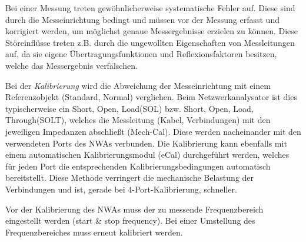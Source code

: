 Bei einer Messung treten gewöhnlicherweise systematische Fehler auf. Diese sind
durch die Messeinrichtung bedingt und müssen vor der Messung erfasst und
korrigiert werden, um möglichst genaue Messergebnisse erzielen zu können. Diese
Störeinflüsse treten z.B. durch die ungewollten Eigenschaften von Messleitungen
auf, da sie eigene Übertragungsfunktionen und Reflexionsfaktoren besitzen,
welche das Messergebnis verfälschen.

Bei der \emph{Kalibrierung} wird die Abweichung der Messeinrichtung mit einem
Referenzobjekt (Standard, Normal) verglichen. Beim Netzwerkanalysator ist dies
typischerweise ein \glqq Short, Open, Load\grqq (SOL) bzw. \glqq Short, Open,
Load, Through\grqq (SOLT), welches die Messleitung (Kabel, Verbindungen) mit den jeweiligen Impedanzen
abschließt (Mech-Cal). Diese werden nacheinander mit den verwendeten Ports des NWAs
verbunden. Die Kalibrierung kann ebenfalls mit einem automatischen
Kalibrierungsmodul (eCal) durchgeführt werden, welches für jeden Port die
entsprechenden Kalibrierungsbedingungen automatisch bereitstellt. Diese Methode
verringert die mechanische Belastung der Verbindungen und ist, gerade bei 4-Port-Kalibrierung, schneller.

Vor der Kalibrierung des NWAs muss der zu messende Frequenzbereich eingestellt
werden (start \& stop frequency). Bei einer Umstellung des Frequenzbereiches muss
erneut kalibriert werden.